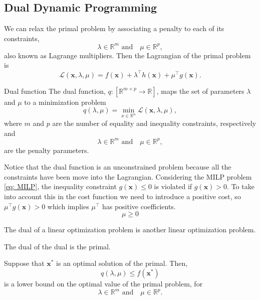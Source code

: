 \subsection{Dual Dynamic Programming}
We can relax the primal problem by associating a penalty to each of its constraints,
\begin{equation}
    \lambda\in\mathbb{R}^{m}\,\, \text{and} \quad \mu\in\mathbb{R}^{p},
\end{equation}
also known as Lagrange multipliers. Then the Lagrangian of the primal problem is
\begin{equation}
    \mathcal{L}(\textbf{x}, \lambda, \mu) = f(\textbf{x}) + \lambda^{\intercal}h(\textbf{x}) + \mu^{\intercal}g(\textbf{x}).
\end{equation}
\begin{definition}{Dual function}{}
The dual function, $q: \left[\mathbb{R}^{m+p}\rightarrow\mathbb{R}\right]$, maps the set of parameters $\lambda$ and $\mu$ to a minimization problem
\begin{equation}
    q(\lambda, \mu) = \min_{x\in\mathbb{R}^{n}}\mathcal{L}(\textbf{x}, \lambda, \mu),
\end{equation}
where $m$ and $p$ are the number of equality and inequality constraints, respectively and
\begin{equation}
    \lambda\in\mathbb{R}^{m}\,\, \text{and} \quad \mu\in\mathbb{R}^{p},
\end{equation}
are the penalty parameters.
\end{definition}
Notice that the dual function is an unconstrained problem because all the constraints have been move into the Lagrangian.
Considering the MILP problem \eqref{eq: MILP}, the inequality constraint $g(\textbf{x})\leq 0$ is violated if $g(\textbf{x})>0$. To take into account this in the cost function we need to introduce a positive cost, so $\mu^{\intercal}g(\textbf{x})>0$ which implies $\mu^{\intercal}$ has positive coefficients.
\begin{equation}
    \mu \geq 0
\end{equation}
\begin{theorem}{}{}
The dual of a linear optimization problem is another linear optimization problem.
\end{theorem}
\begin{theorem}{}{}
The dual of the dual is the primal.
\end{theorem}
\begin{theorem}{}{}
Suppose that $\textbf{x}^{*}$ is an optimal solution of the primal. Then,
\begin{equation}
    q(\lambda, \mu) \leq f(\textbf{x}^{*})
\end{equation}
is a lower bound on the optimal value of the primal problem, for
\begin{equation}
    \lambda\in\mathbb{R}^{m}\,\, \text{and} \quad \mu\in\mathbb{R}^{p}.
\end{equation}
\end{theorem}
